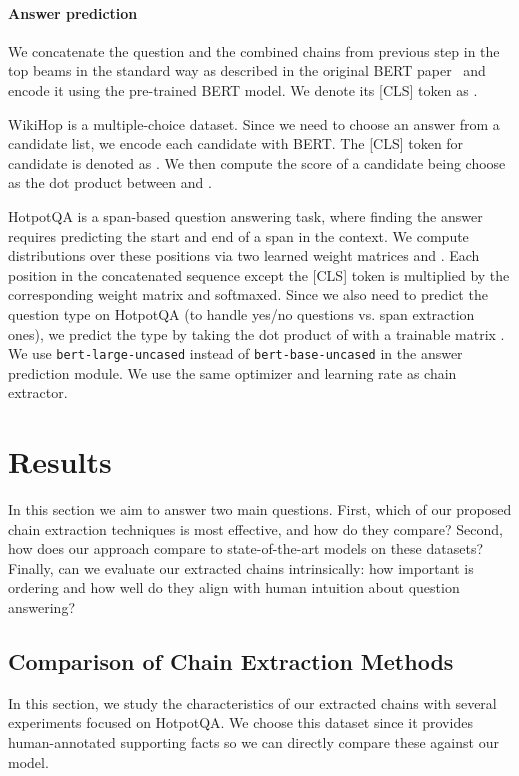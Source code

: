 \documentclass[11pt,a4paper]{article}
\begin{document}
\paragraph{Answer prediction} We concatenate the question and the combined chains from previous step in the top  beams in the standard way as described in the original BERT paper~\cite{devlin2018bert} and encode it using the pre-trained BERT model. We denote its [CLS] token as .

WikiHop is a multiple-choice dataset. Since we need to choose an answer from a candidate list, we encode each candidate with BERT. The [CLS] token for candidate  is denoted as . We then compute the score of a candidate  being choose as the dot product between  and .

HotpotQA is a span-based question answering task, where finding the answer requires predicting the start and end of a span in the context. We compute distributions over these positions via two learned weight matrices  and . Each position in the concatenated sequence except the [CLS] token is multiplied by the corresponding weight matrix and softmaxed. Since we also need to predict the question type on HotpotQA (to handle yes/no questions vs. span extraction ones), we predict the type by taking the dot product of  with a trainable matrix . We use \texttt{bert-large-uncased} instead of \texttt{bert-base-uncased} in the answer prediction module. We use the same optimizer and learning rate as chain extractor.

\section{Results}

In this section we aim to answer two main questions. First, which of our proposed chain extraction techniques is most effective, and how do they compare? Second, how does our approach compare to state-of-the-art models on these datasets? Finally, can we evaluate our extracted chains intrinsically: how important is ordering and how well do they align with human intuition about question answering?


\subsection{Comparison of Chain Extraction Methods}

In this section, we study the characteristics of our extracted chains with several experiments focused on HotpotQA. We choose this dataset since it provides human-annotated supporting facts so we can directly compare these against our model.
\end{document}
